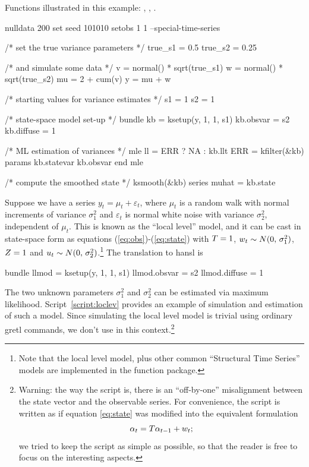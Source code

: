 Functions illustrated in this example: , ,
.

\begin{script}[htbp]
  \label{script:loclev}
\begin{scode}
nulldata 200
set seed 101010
setobs 1 1 --special-time-series

/* set the true variance parameters */
true_s1 = 0.5
true_s2 = 0.25

/* and simulate some data */
v = normal() * sqrt(true_s1)
w = normal() * sqrt(true_s2)
mu = 2 + cum(v)
y = mu + w

/* starting values for variance estimates */
s1 = 1
s2 = 1

/* state-space model set-up */
bundle kb = ksetup(y, 1, 1, s1)
kb.obsvar = s2
kb.diffuse = 1

/* ML estimation of variances */
mle ll = ERR ? NA : kb.llt
    ERR = kfilter(&kb)
    params kb.statevar kb.obsvar
end mle

/* compute the smoothed state */
ksmooth(&kb)
series muhat = kb.state
\end{scode}
\end{script}

Suppose we have a series $y_t = \mu_t + \varepsilon_t$, where $\mu_t$
is a random walk with normal increments of variance $\sigma^2_1$ and
$\varepsilon_t$ is normal white noise with variance $\sigma^2_2$,
independent of $\mu_t$. This is known as the ``local level'' model,
and it can be cast in state-space form as equations
(\ref{eq:obs})-(\ref{eq:state}) with $T = 1$, $w_t \sim
N(0,\, \sigma^2_1)$, $Z = 1$ and $u_t \sim N(0,\,
\sigma^2_2)$.\footnote{Note that the local level model, plus other
  common ``Structural Time Series'' models are implemented in the
   function package.} The translation to \textsf{hansl}
is 
\begin{code}
bundle llmod = ksetup(y, 1, 1, s1)
llmod.obsvar = s2
llmod.diffuse = 1
\end{code}

The two unknown parameters $\sigma^2_1$ and $\sigma^2_2$ can be
estimated via maximum likelihood.  Script~\ref{script:loclev} provides
an example of simulation and estimation of such a model. Since
simulating the local level model is trivial using ordinary gretl
commands, we don't use  in this context.\footnote{Warning:
  the way the script is, there is an ``off-by-one'' misalignment
  between the state vector and the observable series. For convenience,
  the script is written as if equation \eqref{eq:state} was modified
  into the equivalent formulation
  \[
  \alpha_{t} = T \alpha_{t-1} + w_t ;
  \]
  we tried to keep the script as simple as possible, so that the
  reader is free to focus on the interesting aspects.}

